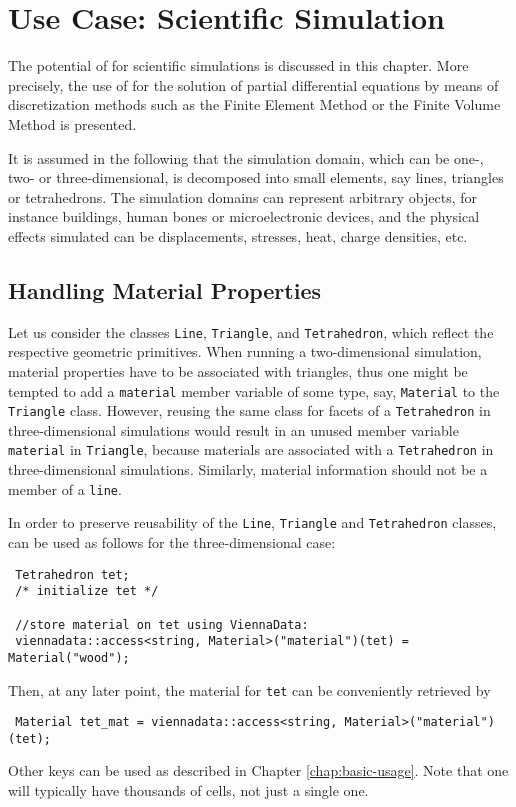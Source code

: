 \chapter{Use Case: Scientific Simulation} \label{chap:use-cases}
The potential of {\ViennaData} for scientific simulations is discussed in this chapter.
More precisely, the use of {\ViennaData} for the solution of partial differential equations by means of discretization methods such as the Finite Element Method or the Finite Volume Method is presented.

It is assumed in the following that the simulation domain, which can be one-, two- or three-dimensional, is decomposed into small elements, say lines, triangles or tetrahedrons. The simulation domains can represent arbitrary objects, for instance buildings, human bones or microelectronic devices, and the physical effects simulated can be displacements, stresses, heat, charge densities, etc. 

\section{Handling Material Properties}
Let us consider the classes \lstinline|Line|, \lstinline|Triangle|, and \lstinline|Tetrahedron|, which reflect the respective geometric primitives.
When running a two-dimensional simulation, material properties have to be associated with triangles, thus one might be tempted to add a \lstinline|material| member variable of some type, say, \lstinline|Material| to the \lstinline|Triangle| class. 
However, reusing the same class for facets of a \lstinline|Tetrahedron| in three-dimensional simulations would result in an unused
member variable \lstinline|material| in \lstinline|Triangle|, because materials are associated with a \lstinline|Tetrahedron| in three-dimensional simulations.
Similarly, material information should not be a member of a \lstinline|line|.

In order to preserve reusability of the \lstinline|Line|, \lstinline|Triangle| and \lstinline|Tetrahedron| classes, {\ViennaData} can be used as follows for the three-dimensional case:
\begin{lstlisting}
 Tetrahedron tet;
 /* initialize tet */

 //store material on tet using ViennaData:
 viennadata::access<string, Material>("material")(tet) = Material("wood"); 
\end{lstlisting}
Then, at any later point, the material for \lstinline|tet| can be conveniently retrieved by
\begin{lstlisting}
 Material tet_mat = viennadata::access<string, Material>("material")(tet); 
\end{lstlisting}
Other keys can be used as described in Chapter \ref{chap:basic-usage}. Note that one will typically have thousands of cells, not just a single one.

